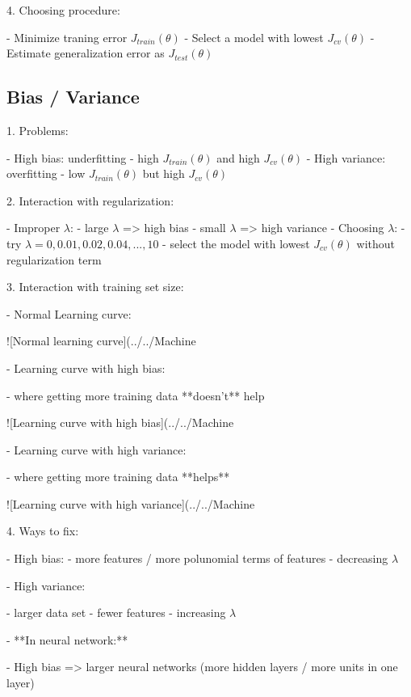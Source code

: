 4. Choosing procedure:

- Minimize traning error $J_{train}(\theta)$ 
- Select a model with lowest $J_{cv}(\theta)$ 
- Estimate generalization error as $J_{test}(\theta)$ 

\subsection{Bias / Variance}

1. Problems:

- High bias: underfitting
- high $J_{train}(\theta)$ and high $J_{cv}(\theta)$
- High variance: overfitting
- low $J_{train}(\theta)$  but high $J_{cv}(\theta)$

2. Interaction with regularization:

- Improper $\lambda$:
- large $\lambda$ => high bias
- small $\lambda$ => high variance
- Choosing $\lambda$:
- try $\lambda=0,0.01,0.02,0.04,...,10$
- select the model with lowest $J_{cv}(\theta)$ without regularization term

3. Interaction with training set size:

- Normal Learning curve:

![Normal learning curve](../../Machine%

- Learning curve with high bias:

- where getting more training data **doesn't** help

![Learning curve with high bias](../../Machine%

- Learning curve with high variance:

- where getting more training data **helps**

![Learning curve with high variance](../../Machine%

4. Ways to fix:

- High bias:
- more features / more polunomial terms of features
- decreasing $\lambda$

- High variance:

- larger data set
- fewer features
- increasing $\lambda$

- **In neural network:**

- High bias => larger neural networks (more hidden layers / more units in one layer)

